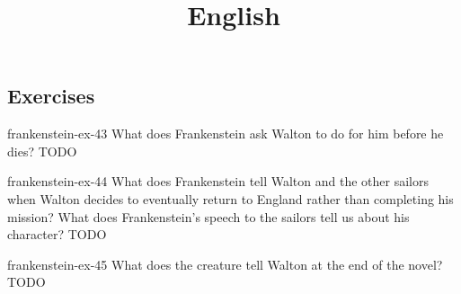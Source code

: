 \documentclass[preview]{standalone}
\begin{document}
\title{English}
\genpage


\subsection{Exercises}

\begin{snippetexercise}{frankenstein-ex-43}
    {What does Frankenstein ask Walton to do for him before he dies?}
    TODO 
\end{snippetexercise}

\begin{snippetexercise}{frankenstein-ex-44}
    {What does Frankenstein tell Walton and the other sailors when Walton decides to eventually
    return to England rather than completing his mission? What does Frankenstein's speech to the
    sailors tell us about his character?}
    TODO 
\end{snippetexercise}

\begin{snippetexercise}{frankenstein-ex-45}
    {What does the creature tell Walton at the end of the novel?}
    TODO 
\end{snippetexercise}
\end{document}
